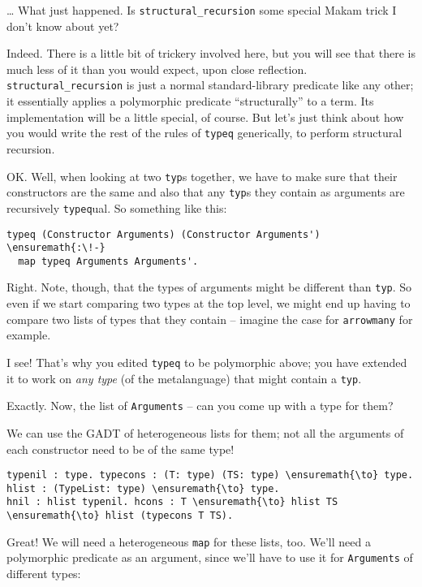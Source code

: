 \importantCodeblockEnd{}

\heroSTUDENT{} \ldots{} What just happened. Is \texttt{structural\_recursion}
some special Makam trick I don't know about yet?

\heroADVISOR{} Indeed. There is a little bit of trickery involved here, but
you will see that there is much less of it than you would expect, upon
close reflection. \texttt{structural\_recursion} is just a normal
standard-library predicate like any other; it essentially applies a
polymorphic predicate ``structurally'' to a term. Its implementation
will be a little special, of course. But let's just think about how you
would write the rest of the rules of \texttt{typeq} generically, to
perform structural recursion.

\heroSTUDENT{} OK. Well, when looking at two \texttt{typ}s together, we have
to make sure that their constructors are the same and also that any
\texttt{typ}s they contain as arguments are recursively
\texttt{typeq}ual. So something like this:

\begin{verbatim}
typeq (Constructor Arguments) (Constructor Arguments') \ensuremath{:\!-}
  map typeq Arguments Arguments'.
\end{verbatim}

\heroADVISOR{} Right. Note, though, that the types of arguments might be
different than \texttt{typ}. So even if we start comparing two types at
the top level, we might end up having to compare two lists of types that
they contain -- imagine the case for \texttt{arrowmany} for example.

\heroSTUDENT{} I see! That's why you edited \texttt{typeq} to be polymorphic
above; you have extended it to work on \emph{any type} (of the
metalanguage) that might contain a \texttt{typ}.

\heroADVISOR{} Exactly. Now, the list of \texttt{Arguments} -- can you come up
with a type for them?

\heroSTUDENT{} We can use the GADT of heterogeneous lists for them; not all
the arguments of each constructor need to be of the same type!

\begin{verbatim}
typenil : type. typecons : (T: type) (TS: type) \ensuremath{\to} type.
hlist : (TypeList: type) \ensuremath{\to} type.
hnil : hlist typenil. hcons : T \ensuremath{\to} hlist TS \ensuremath{\to} hlist (typecons T TS).
\end{verbatim}

\heroADVISOR{} Great! We will need a heterogeneous \texttt{map} for these
lists, too. We'll need a polymorphic predicate as an argument, since
we'll have to use it for \texttt{Arguments} of different types:

